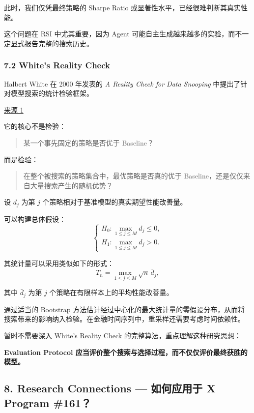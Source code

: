 此时，我们仅凭最终策略的 Sharpe Ratio 或显著性水平，已经很难判断其真实性能。

这个问题在 RSI 中尤其重要，因为 Agent 可能自主生成越来越多的实验，而不一定显式报告完整的搜索历史。

\hypertarget{part-2-16-0001-whites-reality-check}{%
\subsubsection{7.2 White's Reality Check}\label{part-2-16-0001-whites-reality-check}}

Halbert White 在 2000 年发表的 \emph{A Reality Check for Data Snooping} 中提出了针对模型搜索的统计检验框架。

\href{https://onlinelibrary.wiley.com/doi/10.1111/1468-0262.00152}{来源 1}

它的核心不是检验：

\begin{quote}
某一个事先固定的策略是否优于 Baseline？
\end{quote}

而是检验：

\begin{quote}
在整个被搜索的策略集合中，最优策略是否真的优于 Baseline，还是仅仅来自大量搜索产生的随机优势？
\end{quote}

设 \(d_j\) 为第 \(j\) 个策略相对于基准模型的真实期望性能改善量。

可以构建总体假设：
\[\begin{cases}
H_0:\max_{1\leq j\leq M}d_j\leq0,\\
H_1:\max_{1\leq j\leq M}d_j>0.
\end{cases}\]

其统计量可以采用类似如下的形式：
\[T_n=\max_{1\leq j\leq M}
\sqrt n\,\bar d_j,\]

其中 \(\bar d_j\) 为第 \(j\) 个策略在有限样本上的平均性能改善量。

通过适当的 Bootstrap 方法估计经过中心化的最大统计量的零假设分布，从而将搜索带来的影响纳入检验。在金融时间序列中，重采样还需要考虑时间依赖性。

暂时不需要深入 White's Reality Check 的完整算法，重点理解这种研究思想：

\textbf{Evaluation Protocol 应当评价整个搜索与选择过程，而不仅仅评价最终获胜的模型。}

\hypertarget{part-2-16-0001-research-connections-ux5982ux4f55ux5e94ux7528ux4e8e-x-program-161}{%
\subsection{8. Research Connections --- 如何应用于 X Program \#161？}\label{part-2-16-0001-research-connections-ux5982ux4f55ux5e94ux7528ux4e8e-x-program-161}}

